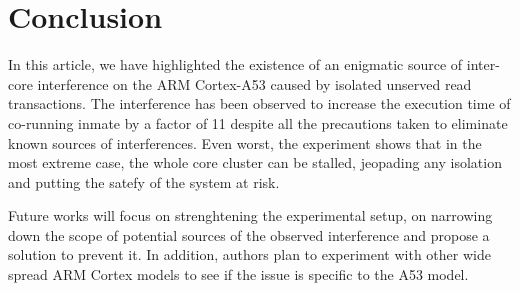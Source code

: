 \section{Conclusion}
    In this article, we have highlighted the existence of an enigmatic source of inter-core interference on the ARM Cortex-A53 caused by isolated unserved read transactions.
    The interference has been observed to increase the execution time of co-running inmate by a factor of 11 despite all the precautions taken to eliminate known sources of interferences.
    Even worst, the experiment shows that in the most extreme case, the whole core cluster can be stalled, jeopading any isolation and putting the satefy of the system at risk.

    Future works will focus on strenghtening the experimental setup, on narrowing down the scope of potential sources of the observed interference and propose a solution to prevent it. In addition, authors plan to experiment with other wide spread ARM Cortex models to see if the issue is specific to the A53 model.

